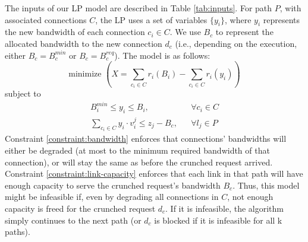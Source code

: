 \documentclass[journal]{IEEEtran}
\begin{document}
The inputs of our LP model are described in Table \ref{tab:inputs}. For path $P$, with associated connections $C$, the LP uses a set of variables $\{y_{i}\}$, where $y_i$ represents the new bandwidth of each connection $c_i \in C$. We use $B_{c}$ to represent the allocated bandwidth to the new connection $d_c$ (i.e., depending on the execution, either $B_{c} = B_{c}^{min}$ or $B_{c} = B_{c}^{req}$). The model is as follows:
$$
\text{minimize } \left(X = \sum\limits_{{c_i} \in C} r_{i}(B_{i}) - \sum\limits_{{c_i} \in C} r_{i}(y_{i})\right)
$$
subject to
\begin{align}
B_{i}^{min} \leq y_{i} \leq B_{i}, && \forall {c_i} \in C \label{constraint:bandwidth}\\
\sum\limits_{{c_i} \in C} y_{i} \cdot v_{i}^{j} \leq z_j - B_{c}, && \forall l_j \in P\label{constraint:link-capacity}
\end{align}
Constraint \ref{constraint:bandwidth} enforces that connections' bandwidths will either be degraded (at most to the minimum required bandwidth of that connection), or will stay the same as before the crunched request arrived. Constraint \ref{constraint:link-capacity} enforces that each link in that path will have enough capacity to serve the crunched request's bandwidth $B_{c}$. Thus, this model might be infeasible if, even by degrading all connections in $C$, not enough capacity is freed for the crunched request $d_c$. If it is infeasible, the algorithm simply continues to the next path (or $d_c$ is blocked if it is infeasible for all k paths).

\end{document}
